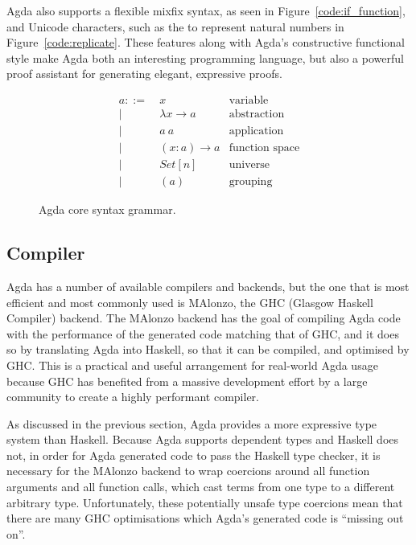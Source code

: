 Agda also supports a flexible mixfix syntax, as seen in Figure~\ref{code:if_function}, and Unicode characters, such as the  to represent natural numbers in Figure~\ref{code:replicate}. These features along with Agda's constructive functional style make Agda both an interesting programming language, but also a powerful proof assistant for generating elegant, expressive proofs.



\begin{figure}
\begin{align*}
a ::=~& x               & \text{variable}\\
    |~& \lambda x \to a & \text{abstraction}\\
    |~& a~a             & \text{application}\\
    |~& (x : a) \to a   & \text{function space}\\
    |~& Set[n]          & \text{universe}\\
    |~& (a)             & \text{grouping}
\end{align*}
\caption{Agda core syntax grammar.\cite{agdawiki}}
\label{fig:grammar}
\end{figure}

\subsection{Compiler}
\label{sec:specific_context}

Agda has a number of available compilers and backends, but the one that is most efficient and most commonly used is MAlonzo, the GHC (Glasgow Haskell Compiler) backend.\cite{benke2007} The MAlonzo backend has the goal of compiling Agda code with the performance of the generated code matching that of GHC, and it does so by translating Agda into Haskell, so that it can be compiled, and optimised by GHC. This is a practical and useful arrangement for real-world Agda usage because GHC has benefited from a massive development effort by a large community to create a highly performant compiler.\cite{benke2007}

As discussed in the previous section, Agda provides a more expressive type system than Haskell. Because Agda supports dependent types and Haskell does not, in order for Agda generated code to pass the Haskell type checker, it is necessary for the MAlonzo backend to wrap coercions around all function arguments and all function calls, which cast terms from one type to a different arbitrary type. Unfortunately, these potentially unsafe type coercions mean that there are many GHC optimisations which Agda's generated code is ``missing out on''.\cite{fredriksson2011}

